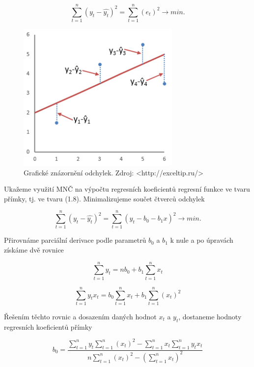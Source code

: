 \documentclass[a4paper,12pt,twoside]{scrreprt}
\begin{document}
\begin{equation}
\sum_{t=1}^{n}(y_t - \hat{y_t})^2 = \sum_{t=1}^{n}(e_t)^2 \rightarrow min. 
\end{equation}

\begin{figure}[h]
  \centering
  \includegraphics[width=8cm]{pictures/odchylky.png}
  \caption{Grafické znázornění odchylek. Zdroj: <http://exceltip.ru/>}
  \label{fig:odchylky}
\end{figure}

Ukažeme využití MNČ na výpočtu regresních koeficientů regresní funkce ve tvaru přímky, tj. ve tvaru (1.8). Minimalizujeme součet čtverců odchylek 

\begin{equation}
\sum_{t=1}^{n}(y_t - \hat{y_t})^2 = \sum_{t=1}^{n}(y_t - b_0 - b_1x)^2 \rightarrow min. 
\end{equation}

Přirovnáme parciální derivace podle parametrů $b_0$ a $b_1$ k nule a po úpravách získáme dvě rovnice

\begin{equation}
\sum_{t=1}^{n}y_t = nb_0 + b_1\sum_{t=1}^{n}x_t
\end{equation}

\begin{equation}
\sum_{t=1}^{n}y_tx_t = b_0\sum_{t=1}^{n}x_t + b_1\sum_{t=1}^{n}(x_t)^2
\end{equation}

Řešením těchto rovnic a dosazením daných hodnot $x_t$ a $y_t$, dostaneme hodnoty regresních koeficientů přímky

\begin{equation}
b_0 = \frac{\sum_{t=1}^{n}y_t\sum_{t=1}^{n}(x_t)^2 - \sum_{t=1}^{n}x_t\sum_{t=1}^{n}y_tx_t} {n\sum_{t=1}^{n}(x_t)^2 - (\sum_{t=1}^{n}x_t)^2} 
\end{equation}
\end{document}
